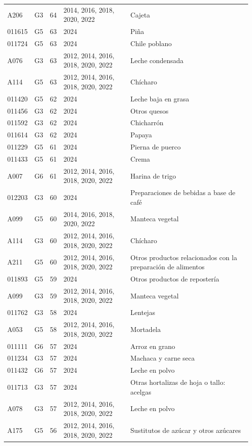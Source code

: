 \begin{table}[ht]
\begin{tabular}{llrll}
  A206 & G3 &  64 & 2014, 2016, 2018, 2020, 2022 & Cajeta \\ 
  011615 & G5 &  63 & 2024 & Piña \\ 
  011724 & G5 &  63 & 2024 & Chile poblano \\ 
  A076 & G3 &  63 & 2012, 2014, 2016, 2018, 2020, 2022 & Leche condensada \\ 
  A114 & G5 &  63 & 2012, 2014, 2016, 2018, 2020, 2022 & Chícharo \\ 
  011420 & G5 &  62 & 2024 & Leche baja en grasa \\ 
  011456 & G3 &  62 & 2024 & Otros quesos \\ 
  011592 & G3 &  62 & 2024 & Chicharrón \\ 
  011614 & G3 &  62 & 2024 & Papaya \\ 
  011229 & G5 &  61 & 2024 & Pierna de puerco \\ 
  011433 & G5 &  61 & 2024 & Crema \\ 
  A007 & G6 &  61 & 2012, 2014, 2016, 2018, 2020, 2022 & Harina de trigo \\ 
  012203 & G3 &  60 & 2024 & Preparaciones de bebidas a base de café \\ 
  A099 & G5 &  60 & 2014, 2016, 2018, 2020, 2022 & Manteca vegetal \\ 
  A114 & G3 &  60 & 2012, 2014, 2016, 2018, 2020, 2022 & Chícharo \\ 
  A211 & G5 &  60 & 2012, 2014, 2016, 2018, 2020, 2022 & Otros productos relacionados con la preparación de alimentos \\ 
  011893 & G5 &  59 & 2024 & Otros productos de repostería \\ 
  A099 & G3 &  59 & 2012, 2014, 2016, 2018, 2020, 2022 & Manteca vegetal \\ 
  011762 & G3 &  58 & 2024 & Lentejas \\ 
  A053 & G5 &  58 & 2012, 2014, 2016, 2018, 2020, 2022 & Mortadela \\ 
  011111 & G6 &  57 & 2024 & Arroz en grano \\ 
  011234 & G3 &  57 & 2024 & Machaca y carne seca \\ 
  011432 & G6 &  57 & 2024 & Leche en polvo \\ 
  011713 & G3 &  57 & 2024 & Otras hortalizas de hoja o tallo: acelgas \\ 
  A078 & G3 &  57 & 2012, 2014, 2016, 2018, 2020, 2022 & Leche en polvo \\ 
  A175 & G5 &  56 & 2012, 2014, 2016, 2018, 2020, 2022 & Sustitutos de azúcar y otros azúcares \\ 

\end{tabular}
\end{table}
